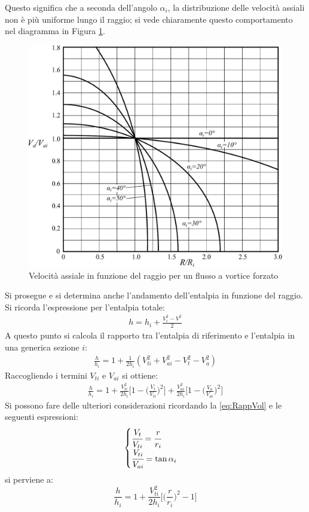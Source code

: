 Questo significa che a seconda dell'angolo $\alpha_i$, la distribuzione delle velocità assiali non è più uniforme lungo il raggio; si vede chiaramente questo comportamento nel diagramma in Figura \ref{fig:TurboFan}.
\begin{figure}
	\centering
	\includegraphics[width=.8\textwidth]{fig/VortForz.pdf}
	\caption{Velocità assiale in funzione del raggio per un flusso a vortice forzato}
	\label{fig:TurboFan}
\end{figure}

Si prosegue e si determina anche l'andamento dell'entalpia in funzione del raggio. Si ricorda l'espressione per l'entalpia totale:
\begin{align*}
h = h_i + \frac{V_i^2 - V^2}{2}
\end{align*}
A questo punto si calcola il rapporto tra l'entalpia di riferimento e l'entalpia in una generica sezione $i$:
\begin{align*}
\frac{h}{h_i} = 1+ \frac{1}{2 h_i} (V_{ti}^2 + V_{ai}^2- V_t^2 -V_a^2)
\end{align*}
Raccogliendo i termini $V_{ti}$ e $V_{ai}$ si ottiene:
\begin{align*}
\frac{h}{h_i} = 1+ \frac{V_{ti}^2}{2 h_i} \bigg[ 1- \bigg( \frac{V_t}{V_{ti}} \bigg)^2 \bigg] + \frac{V_{ai}^2}{2 h_i} \bigg[ 1- \bigg( \frac{V_a}{V_{ai}} \bigg)^2 \bigg]
\end{align*}
Si possono fare delle ulteriori considerazioni ricordando la \ref{eq:RappVol} e le seguenti espressioni:
\begin{align*}
\begin{cases}
\cfrac{V_t}{V_{ti}} = \cfrac{r}{r_i}\\
\cfrac{V_{ti}}{V_{ai}} = \tan \alpha_i
\end{cases}
\end{align*}
si perviene a:
\begin{equation}
\boxed{ \frac{h}{h_i} = 1+ \frac{V_{ti}^2}{2h_i} \bigg[ \bigg( \frac{r}{r_i} \bigg)^2 -1 \bigg] }
\label{eq:rappEntalpie}
\end{equation}

